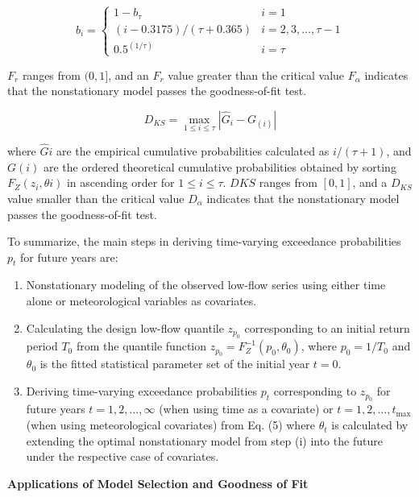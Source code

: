 \documentclass[
]{krantz}
\begin{document}
\[
b_{i}=\left\{\begin{array}{lc}1-b_{\tau} & i=1 \\ (i-0.3175) /(\tau+0.365) & i=2,3, \ldots, \tau-1 \\ 0.5^{(1 / \tau)} & i=\tau\end{array}\right.\tag{21}
\]

\(F_{r}\) ranges from \((0,1]\), and an \(F_{r}\) value greater than the critical value \(F_{\alpha}\) indicates that the nonstationary model passes the goodness-of-fit test.

\[
D_{K S}=\max _{1 \leq i \leq \tau}\left|\hat{G}_{i}-G_{(i)}\right| \tag{22}
\]

where \(\hat{G}{i}\) are the empirical cumulative probabilities calculated as \(i /(\tau+1)\), and \(G{(i)}\) are the ordered theoretical cumulative probabilities obtained by sorting \(F_{Z}\left(z_{i}, {\theta}{i}\right)\) in ascending order for \(1 \leqslant i \leqslant \tau\). \(D{KS}\) ranges from \([0,1]\), and a \(D_{KS}\) value smaller than the critical value \(D_{\alpha}\) indicates that the nonstationary model passes the goodness-of-fit test.

To summarize, the main steps in deriving time-varying exceedance probabilities \(p_{t}\) for future years are:

\begin{enumerate}
\def\labelenumi{(\roman{enumi})}
\item
  Nonstationary modeling of the observed low-flow series using either time alone or meteorological variables as covariates.
\item
  Calculating the design low-flow quantile \(z_{p_{0}}\) corresponding to an initial return period \(T_{0}\) from the quantile function \(z_{p_{0}}=F_{Z}^{-1}\left(p_{0}, {\theta}_{0}\right)\), where \(p_{0}=1 / T_{0}\) and \({\theta}_{0}\) is the fitted statistical parameter set of the initial year \(t=0\).
\item
  Deriving time-varying exceedance probabilities \(p_{t}\) corresponding to \(z_{p_{0}}\) for future years \(t=1,2, \ldots, \infty\) (when using time as a covariate) or \(t=1,2, \ldots, t_{\max }\) (when using meteorological covariates) from Eq. (5) where \({\theta}_{t}\) is calculated by extending the optimal nonstationary model from step (i) into the future under the respective case of covariates.
\end{enumerate}

\textbf{Applications of Model Selection and Goodness of Fit}
\end{document}
